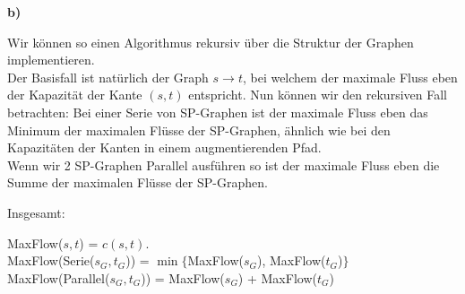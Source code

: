 \documentclass[a4paper,graphics,11pt]{article}
\begin{document}
\qquad\qquad
{}
\qquad\qquad
{}

\newpage

\textbf{b)}

Wir können so einen Algorithmus rekursiv über die Struktur der Graphen implementieren.\\
Der Basisfall ist natürlich der Graph $s \to t$, bei welchem der maximale Fluss eben der Kapazität der Kante $(s,t)$
entspricht.
Nun können wir den rekursiven Fall betrachten:
Bei einer Serie von SP-Graphen ist der maximale Fluss eben das Minimum der maximalen Flüsse der SP-Graphen, ähnlich
wie bei den Kapazitäten der Kanten in einem augmentierenden Pfad.\\
Wenn wir 2 SP-Graphen Parallel ausführen so ist der maximale Fluss eben die Summe der maximalen Flüsse der
SP-Graphen.

Insgesamt:

MaxFlow($s,t$) = $c(s,t)$.\\
MaxFlow(Serie($s_G, t_G$)) = $\min\{$MaxFlow($s_G$), MaxFlow($t_G$)$\}$\\
MaxFlow(Parallel($s_G, t_G$)) = MaxFlow($s_G$) + MaxFlow($t_G$)
\end{document}
